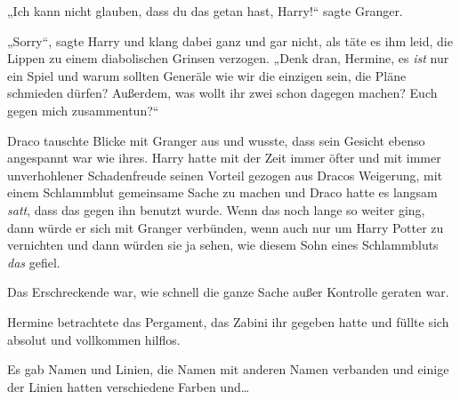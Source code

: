 „Ich kann nicht glauben, dass du das getan hast, Harry!“ sagte Granger.

„Sorry“, sagte Harry und klang dabei ganz und gar nicht, als täte es ihm leid, die Lippen zu einem diabolischen Grinsen verzogen. „Denk dran, Hermine, es \emph{ist} nur ein Spiel und warum sollten Generäle wie wir die einzigen sein, die Pläne schmieden dürfen? Außerdem, was wollt ihr zwei schon dagegen machen? Euch gegen mich zusammentun?“

Draco tauschte Blicke mit Granger aus und wusste, dass sein Gesicht ebenso angespannt war wie ihres. Harry hatte mit der Zeit immer öfter und mit immer unverhohlener Schadenfreude seinen Vorteil gezogen aus Dracos Weigerung, mit einem Schlammblut gemeinsame Sache zu machen und Draco hatte es langsam \emph{satt}, dass das gegen ihn benutzt wurde. Wenn das noch lange so weiter ging, dann würde er sich mit Granger verbünden, wenn auch nur um Harry Potter zu vernichten und dann würden sie ja sehen, wie diesem Sohn eines Schlammbluts \emph{das} gefiel.

\later

Das Erschreckende war, wie schnell die ganze Sache außer Kontrolle geraten war.

Hermine betrachtete das Pergament, das Zabini ihr gegeben hatte und füllte sich absolut und vollkommen hilflos.

Es gab Namen und Linien, die Namen mit anderen Namen verbanden und einige der Linien hatten verschiedene Farben und…

